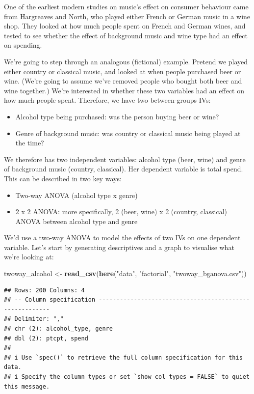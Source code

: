 \documentclass[
]{book}
\newenvironment{Shaded}{\begin{snugshade}}{\end{snugshade}}
\newcommand{\FunctionTok}[1]{\textcolor[rgb]{0.13,0.29,0.53}{\textbf{#1}}}
\newcommand{\NormalTok}[1]{#1}
\newcommand{\OtherTok}[1]{\textcolor[rgb]{0.56,0.35,0.01}{#1}}
\newcommand{\StringTok}[1]{\textcolor[rgb]{0.31,0.60,0.02}{#1}}
\providecommand{\tightlist}{%
  \setlength{\itemsep}{0pt}\setlength{\parskip}{0pt}}
\begin{document}
One of the earliest modern studies on music's effect on consumer behaviour came from Hargreaves and North, who played either French or German music in a wine shop. They looked at how much people spent on French and German wines, and tested to see whether the effect of background music and wine type had an effect on spending.

We're going to step through an analogous (fictional) example. Pretend we played either country or classical music, and looked at when people purchased beer or wine. (We're going to assume we've removed people who bought both beer and wine together.) We're interested in whether these two variables had an effect on how much people spent. Therefore, we have two between-groups IVs:

\begin{itemize}
\tightlist
\item
  Alcohol type being purchased: was the person buying beer or wine?
\item
  Genre of background music: was country or classical music being played at the time?
\end{itemize}

We therefore has two independent variables: alcohol type (beer, wine) and genre of background music (country, classical). Her dependent variable is total spend. This can be described in two key ways:

\begin{itemize}
\tightlist
\item
  Two-way ANOVA (alcohol type x genre)
\item
  2 x 2 ANOVA: more specifically, 2 (beer, wine) x 2 (country, classical) ANOVA between alcohol type and genre
\end{itemize}

We'd use a two-way ANOVA to model the effects of two IVs on one dependent variable. Let's start by generating descriptives and a graph to visualise what we're looking at:

\begin{Shaded}
\begin{Highlighting}[]
\NormalTok{twoway\_alcohol }\OtherTok{\textless{}{-}} \FunctionTok{read\_csv}\NormalTok{(}\FunctionTok{here}\NormalTok{(}\StringTok{"data"}\NormalTok{, }\StringTok{"factorial"}\NormalTok{, }\StringTok{"twoway\_bganova.csv"}\NormalTok{))}
\end{Highlighting}
\end{Shaded}

\begin{verbatim}
## Rows: 200 Columns: 4
## -- Column specification --------------------------------------------------------
## Delimiter: ","
## chr (2): alcohol_type, genre
## dbl (2): ptcpt, spend
## 
## i Use `spec()` to retrieve the full column specification for this data.
## i Specify the column types or set `show_col_types = FALSE` to quiet this message.
\end{verbatim}
\end{document}
